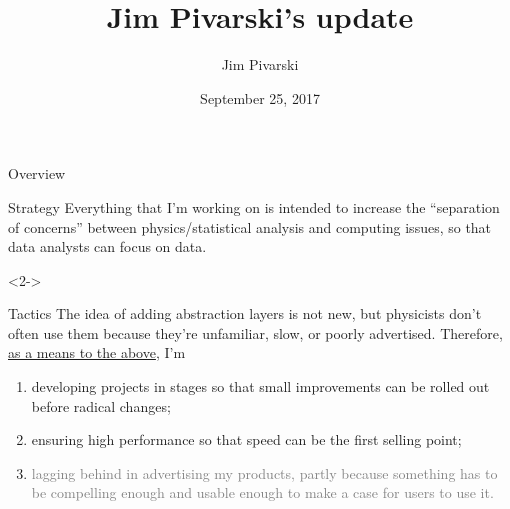 \documentclass{beamer}
\title[2017-09-25-dianahep-update]{Jim Pivarski's update}
\author{Jim Pivarski}
\institute{Princeton University -- DIANA}
\date{September 25, 2017}
\begin{document}

\begin{frame}
  \titlepage
\end{frame}




\begin{frame}{Overview}
\vspace{0.25 cm}
\begin{block}{Strategy}
Everything that I'm working on is intended to increase the ``separation of concerns'' between physics/statistical analysis and computing issues, so that data analysts can focus on data.
\end{block}

\begin{uncoverenv}<2->
\begin{block}{Tactics}
The idea of adding abstraction layers is not new, but physicists don't often use them because they're unfamiliar, slow, or poorly advertised. Therefore, \underline{as a means to the above}, I'm
\begin{enumerate}
\item<3-> developing projects in stages so that small improvements can be rolled out before radical changes;
\item<4-> ensuring high performance so that speed can be the first selling point;
\item<5-> \textcolor{gray}{lagging behind in advertising my products, partly because something has to be compelling enough and usable enough to make a case for users to use it.}
\end{enumerate}
\end{block}
\end{uncoverenv}
\end{frame}
\end{document}

